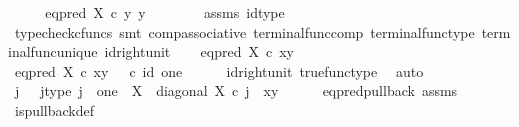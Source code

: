 \begin{isabellebody}
\ \ \isamarkupfalse%
\ \isamarkupfalse%
\ {\isachardoublequoteopen}eq{\isacharunderscore}{\kern0pt}pred\ X\ {\isasymcirc}\isactrlsub c\ {\isasymlangle}y{\isacharcomma}{\kern0pt}\ y{\isasymrangle}\ {\isacharequal}{\kern0pt}\ {\isasymt}{\isachardoublequoteclose}\isanewline
\ \ \ \ \isamarkupfalse%
\ assms\ id{\isacharunderscore}{\kern0pt}type\isanewline
\ \ \ \ \isamarkupfalse%
\ {\isacharparenleft}{\kern0pt}typecheck{\isacharunderscore}{\kern0pt}cfuncs{\isacharcomma}{\kern0pt}\ smt\ comp{\isacharunderscore}{\kern0pt}associative{}\ terminal{\isacharunderscore}{\kern0pt}func{\isacharunderscore}{\kern0pt}comp\ terminal{\isacharunderscore}{\kern0pt}func{\isacharunderscore}{\kern0pt}type\ terminal{\isacharunderscore}{\kern0pt}func{\isacharunderscore}{\kern0pt}unique\ id{\isacharunderscore}{\kern0pt}right{\isacharunderscore}{\kern0pt}unit{}{\isacharparenright}{\kern0pt}\isanewline
{}\isamarkupfalse%
\isanewline
\ \ \isamarkupfalse%
\ {\isachardoublequoteopen}eq{\isacharunderscore}{\kern0pt}pred\ X\ {\isasymcirc}\isactrlsub c\ {\isasymlangle}x{\isacharcomma}{\kern0pt}y{\isasymrangle}\ {\isacharequal}{\kern0pt}\ {\isasymt}{\isachardoublequoteclose}\isanewline
\ \ \isamarkupfalse%
\ \isamarkupfalse%
\ {\isachardoublequoteopen}eq{\isacharunderscore}{\kern0pt}pred\ X\ {\isasymcirc}\isactrlsub c\ {\isasymlangle}x{\isacharcomma}{\kern0pt}y{\isasymrangle}\ {\isacharequal}{\kern0pt}\ {\isasymt}\ {\isasymcirc}\isactrlsub c\ id\ one{\isachardoublequoteclose}\isanewline
\ \ \ \ \isamarkupfalse%
\ id{\isacharunderscore}{\kern0pt}right{\isacharunderscore}{\kern0pt}unit{}\ true{\isacharunderscore}{\kern0pt}func{\isacharunderscore}{\kern0pt}type\ \isamarkupfalse%
\ auto\isanewline
\ \ \isamarkupfalse%
\ \isamarkupfalse%
\ j\ \ \ j{\isacharunderscore}{\kern0pt}type{\isacharcolon}{\kern0pt}\ {\isachardoublequoteopen}j\ {\isacharcolon}{\kern0pt}\ one\ {\isasymrightarrow}\ X{\isachardoublequoteclose}\ \ {\isachardoublequoteopen}diagonal\ X\ {\isasymcirc}\isactrlsub c\ j\ {\isacharequal}{\kern0pt}\ {\isasymlangle}x{\isacharcomma}{\kern0pt}y{\isasymrangle}{\isachardoublequoteclose}\isanewline
\ \ \ \ \isamarkupfalse%
\ eq{\isacharunderscore}{\kern0pt}pred{\isacharunderscore}{\kern0pt}pullback\ assms\ \isamarkupfalse%
\ is{\isacharunderscore}{\kern0pt}pullback{\isacharunderscore}{\kern0pt}def\ \isamarkupfalse%

\end{isabellebody}

